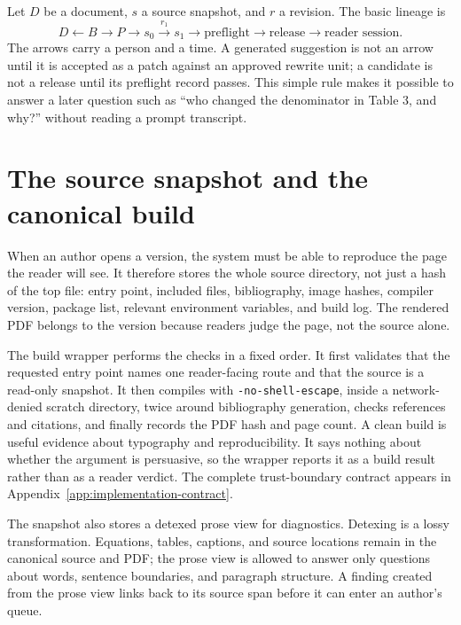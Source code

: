 Let $D$ be a document, $s$ a source snapshot, and $r$ a revision. The basic
lineage is
\begin{equation}
  D \longleftarrow B \longrightarrow P \longrightarrow s_0
  \xrightarrow{\;r_1\;} s_1 \longrightarrow \text{preflight}
  \longrightarrow \text{release} \longrightarrow \text{reader session}.
  \label{eq:architecture-lineage}
\end{equation}
The arrows carry a person and a time. A generated suggestion is not an arrow
until it is accepted as a patch against an approved rewrite unit; a candidate is
not a release until its preflight record passes. This simple rule makes
it possible to answer a later question such as ``who changed the denominator
in Table 3, and why?'' without reading a prompt transcript.

\section{The source snapshot and the canonical build}
\label{sec:architecture-snapshot}

When an author opens a version, the system must be able to reproduce the page
the reader will see. It therefore stores the whole source directory, not just a
hash of the top file: entry point, included files, bibliography, image hashes,
compiler version, package list, relevant environment variables, and build log.
The rendered PDF belongs to the version because readers judge the page, not the
source alone.

The build wrapper performs the checks in a fixed order. It first validates that
the requested entry point names one reader-facing route and that the source is a
read-only snapshot. It then compiles with \texttt{-no-shell-escape}, inside a
network-denied scratch directory, twice around bibliography generation, checks
references and citations, and finally records the PDF hash and page count. A
clean build is useful evidence about typography and reproducibility. It says
nothing about whether the argument is persuasive, so the wrapper reports it as
a build result rather than as a reader verdict. The complete trust-boundary
contract appears in Appendix~\ref{app:implementation-contract}.

The snapshot also stores a detexed prose view for diagnostics. Detexing is a
lossy transformation. Equations, tables, captions, and source locations remain
in the canonical source and PDF; the prose view is allowed to answer only
questions about words, sentence boundaries, and paragraph structure. A finding
created from the prose view links back to its source span before it can enter an
author's queue.

